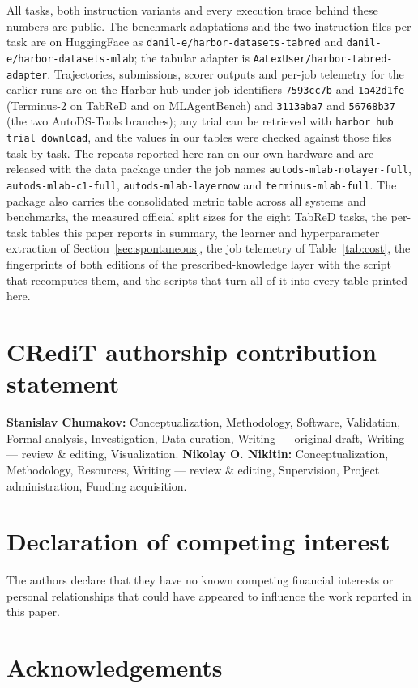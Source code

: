 \begin{sloppypar}
All tasks, both instruction variants and every execution trace behind these
numbers are public. The benchmark adaptations and the two instruction files per
task are on HuggingFace as \texttt{danil-e/harbor-datasets-tabred} and
\texttt{danil-e/harbor-datasets-mlab}; the tabular adapter is
\texttt{AaLexUser/harbor-tabred-adapter}. Trajectories, submissions, scorer
outputs and per-job telemetry for the earlier runs are on the Harbor hub under
job identifiers \texttt{7593cc7b} and \texttt{1a42d1fe} (Terminus-2 on TabReD and
on MLAgentBench) and \texttt{3113aba7} and \texttt{56768b37} (the two
AutoDS-Tools branches); any trial can be retrieved with \texttt{harbor hub trial
download}, and the values in our tables were checked against those files task by
task. The repeats reported here ran on our own hardware and are released with the
data package under the job names \texttt{autods-mlab-nolayer-full},
\texttt{autods-mlab-c1-full}, \texttt{autods-mlab-layernow} and
\texttt{terminus-mlab-full}. The package also carries the consolidated metric
table across all systems and benchmarks, the measured official split sizes for
the eight TabReD tasks, the per-task tables this paper reports in summary, the
learner and hyperparameter extraction of Section~\ref{sec:spontaneous}, the job
telemetry of Table~\ref{tab:cost}, the fingerprints of both editions of the
prescribed-knowledge layer with the script that recomputes them, and the scripts
that turn all of it into every table printed here.
\end{sloppypar}

\section*{CRediT authorship contribution statement}

\textbf{Stanislav Chumakov:} Conceptualization, Methodology, Software,
Validation, Formal analysis, Investigation, Data curation, Writing --- original
draft, Writing --- review \& editing, Visualization.
\textbf{Nikolay O. Nikitin:} Conceptualization, Methodology, Resources,
Writing --- review \& editing, Supervision, Project administration,
Funding acquisition.

\section*{Declaration of competing interest}

The authors declare that they have no known competing financial interests or
personal relationships that could have appeared to influence the work reported
in this paper.

\section*{Acknowledgements}
